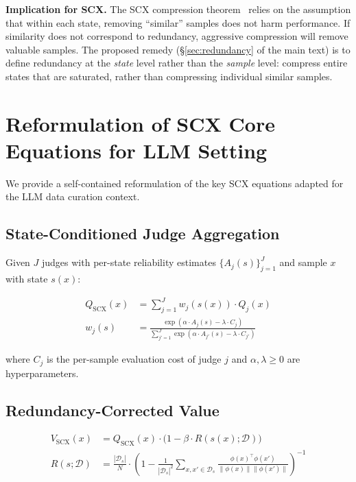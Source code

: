 \documentclass[11pt]{article}
\begin{document}
\textbf{Implication for SCX.} The SCX compression theorem~\cite{scx2026} relies on the assumption that within each state, removing ``similar'' samples does not harm performance. If similarity does not correspond to redundancy, aggressive compression will remove valuable samples. The proposed remedy (\S\ref{sec:redundancy} of the main text) is to define redundancy at the \textit{state} level rather than the \textit{sample} level: compress entire states that are saturated, rather than compressing individual similar samples.

\section{Reformulation of SCX Core Equations for LLM Setting}

We provide a self-contained reformulation of the key SCX equations adapted for the LLM data curation context.

\subsection{State-Conditioned Judge Aggregation}

Given $J$ judges with per-state reliability estimates $\{A_j(s)\}_{j=1}^J$ and sample $x$ with state $s(x)$:

\begin{align}
Q_{\text{SCX}}(x) &= \sum_{j=1}^J w_j(s(x)) \cdot Q_j(x) \label{eq:supp_aggregation} \\
w_j(s) &= \frac{\exp(\alpha \cdot A_j(s) - \lambda \cdot C_j)}{\sum_{j'=1}^J \exp(\alpha \cdot A_{j'}(s) - \lambda \cdot C_{j'})} \label{eq:supp_weights}
\end{align}

\noindent where $C_j$ is the per-sample evaluation cost of judge $j$ and $\alpha, \lambda \geq 0$ are hyperparameters.

\subsection{Redundancy-Corrected Value}

\begin{align}
V_{\text{SCX}}(x) &= Q_{\text{SCX}}(x) \cdot \bigl(1 - \beta \cdot R(s(x); \mathcal{D})\bigr) \label{eq:supp_value} \\
R(s; \mathcal{D}) &= \frac{|\mathcal{D}_s|}{N} \cdot \left(1 - \frac{1}{|\mathcal{D}_s|^2} \sum_{x,x' \in \mathcal{D}_s} \frac{\phi(x)^\top \phi(x')}{\|\phi(x)\|\|\phi(x')\|}\right)^{-1} \label{eq:supp_redundancy}
\end{align}
\end{document}

